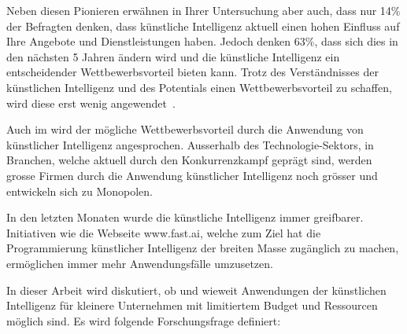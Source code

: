 Neben diesen Pionieren erwähnen \textcite{Ransbotham2017} in Ihrer Untersuchung aber auch, dass nur 14\% der Befragten denken, dass künstliche Intelligenz aktuell einen hohen Einfluss auf Ihre Angebote und Dienstleistungen haben. Jedoch denken 63\%, dass sich dies in den nächsten 5 Jahren ändern wird und die künstliche Intelligenz ein entscheidender Wettbewerbsvorteil bieten kann. Trotz des Verständnisses der künstlichen Intelligenz und des Potentials einen Wettbewerbsvorteil zu schaffen, wird diese erst wenig angewendet~\autocite{Ransbotham2017}.

Auch im \textcite{TheEconomist2018} wird der mögliche Wettbewerbsvorteil durch die Anwendung von künstlicher Intelligenz angesprochen. Ausserhalb des Technologie-Sektors, in Branchen, welche aktuell durch den Konkurrenzkampf geprägt sind, werden grosse Firmen durch die Anwendung künstlicher Intelligenz noch grösser und entwickeln sich zu Monopolen.

In den letzten Monaten wurde die künstliche Intelligenz immer greifbarer. Initiativen wie die Webseite www.fast.ai, welche zum Ziel hat die Programmierung künstlicher Intelligenz der breiten Masse zugänglich zu machen, ermöglichen immer mehr Anwendungsfälle umzusetzen.

In dieser Arbeit wird diskutiert, ob und wieweit Anwendungen der künstlichen Intelligenz für kleinere Unternehmen mit limitiertem Budget und Ressourcen möglich sind. Es wird folgende Forschungsfrage definiert:

{
    \medskip
    \setlength{\fboxsep}{1em}
    \noindent{}
    \medskip
}





